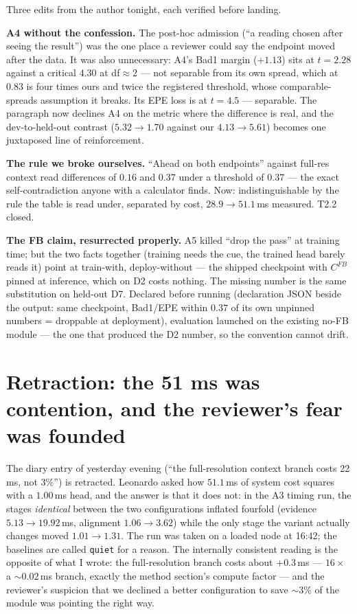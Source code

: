 \documentclass[11pt,a4paper]{article}
\begin{document}
Three edits from the author tonight, each verified before landing.

\textbf{A4 without the confession.} The post-hoc admission (``a reading chosen
after seeing the result'') was the one place a reviewer could say the endpoint
moved after the data. It was also unnecessary: A4's Bad1 margin ($+1.13$) sits
at $t=2.28$ against a critical $4.30$ at df${\approx}2$ --- not separable from
its own spread, which at $0.83$ is four times ours and twice the registered
threshold, whose comparable-spreads assumption it breaks. Its EPE loss is at
$t=4.5$ --- separable. The paragraph now declines A4 on the metric where the
difference is real, and the dev-to-held-out contrast ($5.32 \to 1.70$ against
our $4.13 \to 5.61$) becomes one juxtaposed line of reinforcement.

\textbf{The rule we broke ourselves.} ``Ahead on both endpoints'' against
full-res context read differences of $0.16$ and $0.37$ under a threshold of
$0.37$ --- the exact self-contradiction anyone with a calculator finds. Now:
indistinguishable by the rule the table is read under, separated by cost,
$28.9 \to 51.1$\,ms measured. T2.2 closed.

\textbf{The FB claim, resurrected properly.} A5 killed ``drop the pass'' at
training time; but the two facts together (training needs the cue, the trained
head barely reads it) point at train-with, deploy-without --- the shipped
checkpoint with $C^{FB}$ pinned at inference, which on D2 costs nothing. The
missing number is the same substitution on held-out D7. Declared before
running (declaration JSON beside the output: same checkpoint, Bad1/EPE within
$0.37$ of its own unpinned numbers = droppable at deployment), evaluation
launched on the existing no-FB module --- the one that produced the D2 number,
so the convention cannot drift.



\section*{Retraction: the 51 ms was contention, and the reviewer's fear was founded}

The diary entry of yesterday evening (``the full-resolution context branch
costs 22 ms, not 3\%'') is retracted. Leonardo asked how $51.1$\,ms of system
cost squares with a $1.00$\,ms head, and the answer is that it does not: in
the A3 timing run, the stages \emph{identical} between the two configurations
inflated fourfold (evidence $5.13 \to 19.92$\,ms, alignment $1.06 \to 3.62$)
while the only stage the variant actually changes moved $1.01 \to 1.31$. The
run was taken on a loaded node at 16:42; the baselines are called
\texttt{quiet} for a reason. The internally consistent reading is the
opposite of what I wrote: the full-resolution branch costs about $+0.3$\,ms
--- $16\times$ a ${\sim}0.02$\,ms branch, exactly the method section's
compute factor --- and the reviewer's suspicion that we declined a better
configuration to save ${\sim}3\%$ of the module was pointing the right way.
\end{document}
